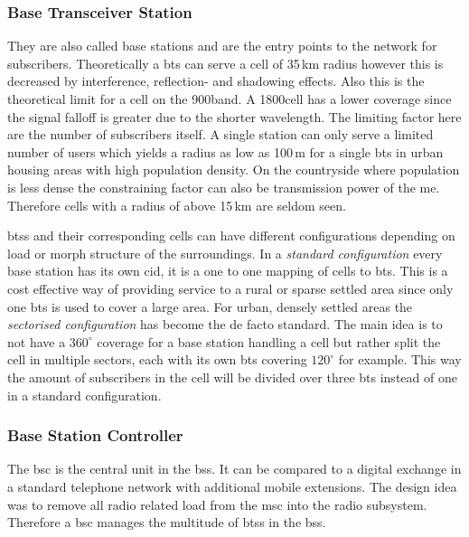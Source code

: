 \subsubsection{Base Transceiver Station}
They are also called base stations and are the entry points to the network for subscribers.
Theoretically a \gls{bts} can serve a cell of 35\,km radius however this is decreased by interference, reflection- and shadowing effects.
Also this is the theoretical limit for a cell on the 900\MHz band.
A 1800\MHz cell has a lower coverage since the signal falloff is greater due to the shorter wavelength.
The limiting factor here are the number of subscribers itself.
A single station can only serve a limited number of users which yields a radius as low as 100\,m for a single \gls{bts} in urban housing areas \cite{kommsys2006} with high population density.
On the countryside where population is less dense the constraining factor can also be transmission power of the \gls{me}.
Therefore cells with a radius of above 15\,km are seldom seen.

\glspl{bts} and their corresponding cells can have different configurations depending on load or morph structure of the surroundings.
In a \emph{standard configuration} every base station has its own \gls{cid}, it is a one to one mapping of cells to \gls{bts}.
This is a cost effective way of providing service to a rural or sparse settled area since only one \gls{bts} is used to cover a large area.
For urban, densely settled areas the  \emph{sectorised configuration} has become the de facto standard.
The main idea is to not have a $360^\circ$ coverage for a base station handling a cell but rather split the cell in multiple sectors, each with its own \gls{bts} covering $120^\circ$ for example. 
This way the amount of subscribers in the cell will be divided over three \gls{bts} instead of one in a standard configuration.

\subsubsection{Base Station Controller}
The \gls{bsc} is the central unit in the \gls{bss}.
It can be compared to a digital exchange in a standard telephone network with additional mobile extensions.
The design idea was to remove all radio related load from the \gls{msc} into the radio subsystem.
Therefore a \gls{bsc} manages the multitude of \glspl{bts} in the \gls{bss}.


